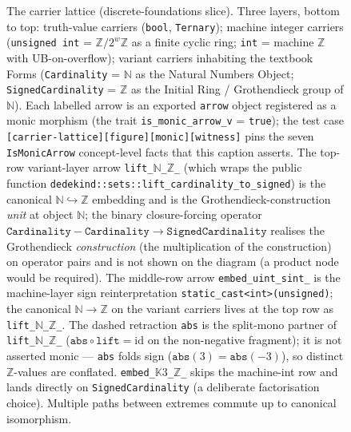 \documentclass[11pt, a4paper]{report}
\begin{document}
\begin{figure}[ht]
\centering
{}
\caption{The carrier lattice (discrete-foundations slice). Three layers, bottom to top: truth-value carriers (\texttt{bool}, \texttt{Ternary}); machine integer carriers (\texttt{unsigned~int} = $\mathbb{Z}/2^w\mathbb{Z}$ as a finite cyclic ring; \texttt{int} = machine $\mathbb{Z}$ with UB-on-overflow); variant carriers inhabiting the textbook Forms (\texttt{Cardinality} = $\mathbb{N}$ as the Natural Numbers Object; \texttt{SignedCardinality} = $\mathbb{Z}$ as the Initial Ring / Grothendieck group of $\mathbb{N}$). Each labelled arrow is an exported \texttt{arrow} object registered as a monic morphism (the trait \texttt{is\_monic\_arrow\_v} = \texttt{true}); the test case \texttt{[carrier-lattice][figure][monic][witness]} pins the seven \texttt{IsMonicArrow} concept-level facts that this caption asserts. The top-row variant-layer arrow \texttt{lift\_}$\mathbb{N}$\texttt{\_}$\mathbb{Z}$\texttt{\_} (which wraps the public function \texttt{dedekind::sets::lift\_cardinality\_to\_signed}) is the canonical $\mathbb{N} \hookrightarrow \mathbb{Z}$ embedding and is the Grothendieck-construction \emph{unit} at object $\mathbb{N}$; the binary closure-forcing operator $\texttt{Cardinality} - \texttt{Cardinality} \to \texttt{SignedCardinality}$ realises the Grothendieck \emph{construction} (the multiplication of the construction) on operator pairs and is not shown on the diagram (a product node would be required). The middle-row arrow \texttt{embed\_uint\_sint\_} is the machine-layer sign reinterpretation \texttt{static\_cast<int>(unsigned)}; the canonical $\mathbb{N} \to \mathbb{Z}$ on the variant carriers lives at the top row as \texttt{lift\_}$\mathbb{N}$\texttt{\_}$\mathbb{Z}$\texttt{\_}. The dashed retraction \texttt{abs} is the split-mono partner of \texttt{lift\_}$\mathbb{N}$\texttt{\_}$\mathbb{Z}$\texttt{\_} ($\texttt{abs} \circ \texttt{lift} = \mathrm{id}$ on the non-negative fragment); it is not asserted monic --- \texttt{abs} folds sign ($\texttt{abs}(3) = \texttt{abs}(-3)$), so distinct $\mathbb{Z}$-values are conflated. \texttt{embed\_}$\mathbb{K}3$\texttt{\_}$\mathbb{Z}$\texttt{\_} skips the machine-int row and lands directly on \texttt{SignedCardinality} (a deliberate factorisation choice). Multiple paths between extremes commute up to canonical isomorphism.}

\end{figure}
\end{document}
